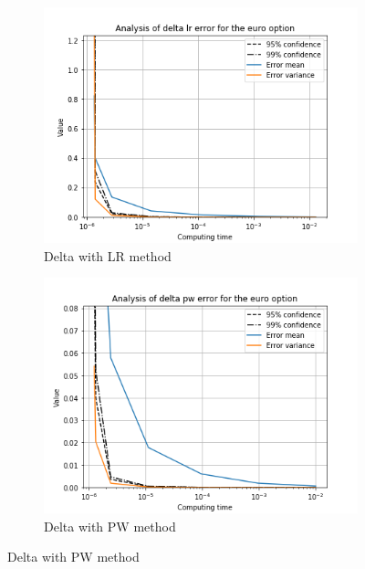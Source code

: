 \documentclass[11pt,a4paper,fleqn]{article}
\begin{document}
\begin{figure}[h!]
  \centering
      \begin{subfigure}[b]{0.45\textwidth}
          \includegraphics[width=\textwidth]{graphs/eurodeltalrtime.png}
          \caption{Delta with LR method}
      \end{subfigure}
      \begin{subfigure}[b]{0.45\textwidth}
          \includegraphics[width=\textwidth]{graphs/eurodeltapwtime.png}
          \caption{Delta with PW method}
      \end{subfigure}


\end{figure}
\end{document}
